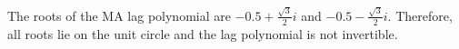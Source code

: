 The roots of the MA lag polynomial are $-0.5+\frac{\sqrt{3}}{2} i$ and $-0.5-\frac{\sqrt{3}}{2} i$. Therefore, all roots lie on the unit circle and the lag polynomial is not invertible.\\

